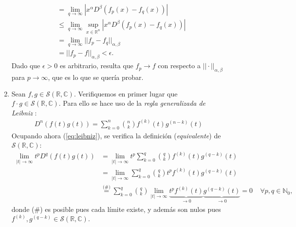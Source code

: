 \documentclass[spanish, fleqn]{article}
\begin{document}
\begin{description}
\begin{enumerate}
\begin{align*}
        	&= \lim_{q \rightarrow \infty} \left| x^{\alpha} D^{\beta} \left( f_p(x) - f_q(x) \right) \right| \\
        	&\leq \lim_{q \rightarrow \infty} \sup_{x \in \mathbb{R}^n} \left| x^{\alpha} D^{\beta} \left( f_p(x) - f_q(x) \right) \right| \\
        	&=  \lim_{q \rightarrow \infty} ||f_p - f_q ||_{\alpha,\beta}  \\
        	&= ||f_p - f ||_{\alpha,\beta} < \epsilon.
        \end{align*}
        Dado que $\epsilon > 0$ es arbitrario, resulta que $f_p \rightarrow f$ con respecto a $||\cdot||_{\alpha,\beta}$ para $p \rightarrow \infty$, que es lo que se quería probar.



        \item Sean $f,g  \in \mathcal{S}(\mathbb{R},\mathbb{C})$. Verifiquemos en primer lugar que $f\cdot g \in \mathcal{S}(\mathbb{R},\mathbb{C})$. Para ello se hace uso de la \textit{regla generalizada de Leibniz} \cite{Leibniz}:
        \begin{align}
            D^n \left(f(t)g(t) \right) = \sum_{k=0}^n {n \choose k} f^{(k)}(t) g^{(n-k)}(t)
        \label{eq:leibniz}
        \end{align}
        Ocupando ahora (\ref{eq:leibniz}), se verifica la definición (\textit{equivalente}) de $\mathcal{S}(\mathbb{R},\mathbb{C})$:
        \begin{align*}
            \lim_{|t|\rightarrow \infty} t^p D^q \left( f(t)g(t) \right)
            &= \lim_{|t|\rightarrow \infty} t^p \sum_{k=0}^q {q \choose k} f^{(k)}(t) g^{(q-k)}(t) \\
            &= \lim_{|t|\rightarrow \infty} \sum_{k=0}^q {q \choose k} t^p f^{(k)}(t) g^{(q-k)}(t) \\
            &\stackrel{\text{(\#)}}{=} \sum_{k=0}^q {q \choose k}\lim_{|t|\rightarrow \infty}  \underbrace{t^p f^{(k)}(t)}_{\rightarrow 0} \underbrace{g^{(q-k)}(t)}_{\rightarrow 0} = 0 \ \ \ \ \ \forall p,q \in \mathbb{N}_0,
        \end{align*}
        donde (\#) es posible pues cada límite existe, y además son nulos pues $f^{(k)},g^{(q-k)} \in \mathcal{S}(\mathbb{R},\mathbb{C})$.


\end{enumerate}
\end{description}
\end{document}
